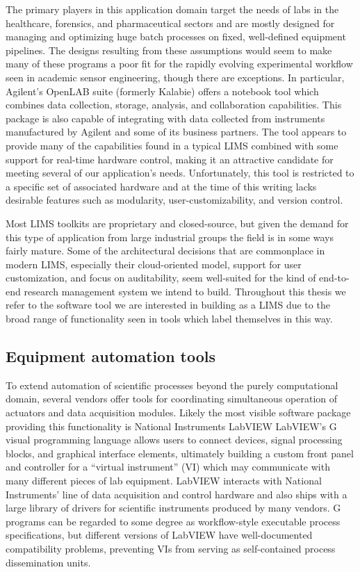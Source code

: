\documentclass[../thesis]{subfiles}
\begin{document}
The primary players in this application domain target the needs of
labs in the healthcare, forensics, and pharmaceutical sectors and are
mostly designed for managing and optimizing huge batch processes on
fixed, well-defined equipment pipelines. The designs resulting from
these assumptions would seem to make many of these programs a poor fit
for the rapidly evolving experimental workflow seen in academic sensor
engineering, though there are exceptions.
In particular, Agilent's OpenLAB suite (formerly Kalabie)
\cite{OpenLAB} offers a notebook tool which combines data collection,
storage, analysis, and collaboration capabilities. This package is
also capable of integrating with data collected from instruments
manufactured by Agilent and some of its business partners. The tool
appears to provide many of the capabilities found in a typical
\gls{LIMS} combined with some support for real-time hardware control,
making it an attractive candidate for meeting several of our
application's needs. Unfortunately, this tool is restricted to a
specific set of associated hardware and at the time of this writing
lacks desirable features such as modularity, user-customizability, and
version control.

Most \gls{LIMS} toolkits are proprietary and closed-source, but given the
demand for this type of application from large industrial groups the
field is in some ways fairly mature. Some of the architectural
decisions that are commonplace in modern \gls{LIMS}, especially their
cloud-oriented model, support for user customization, and focus on
auditability, seem well-suited
for the kind of end-to-end research management system we intend to
build. Throughout this thesis we refer to the software tool we are interested
in building as a \gls{LIMS} due to the broad range of
functionality seen in tools which label themselves in this way.

\subsection{Equipment automation tools}
To extend automation of scientific processes beyond the purely
computational domain, several vendors offer tools for coordinating
simultaneous operation of actuators and data acquisition modules.
Likely the most visible software package providing this functionality
is National Instruments LabVIEW \cite{ELLIOTT2007}
LabVIEW's G visual programming language allows users to connect
devices, signal processing blocks, and graphical interface elements,
ultimately building a custom front panel and controller for a
``virtual instrument'' (VI) which may communicate with many different
pieces of lab equipment. LabVIEW interacts with National Instruments'
line of data acquisition and control hardware and also ships with a
large library of drivers for scientific instruments produced by many
vendors. G programs can be regarded to some degree as workflow-style
executable process specifications, but different versions of LabVIEW
have well-documented compatibility problems, preventing VIs from
serving as self-contained process dissemination units.
\end{document}
